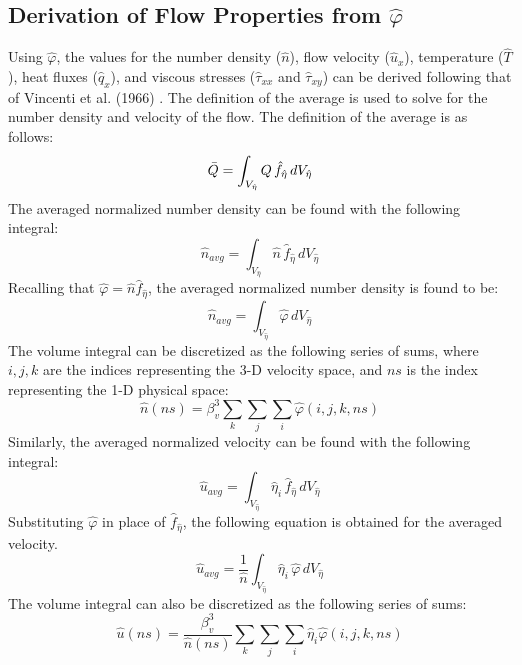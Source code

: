 \documentclass[a4paper]{article}
\begin{document}
\subsection{Derivation of Flow Properties from $\hat{\varphi}$}
Using $\hat{\varphi}$, the values for the number density ($\hat{n}$), flow velocity ($\hat{u}_x$), temperature ($\hat{T}$), heat fluxes ($\hat{q}_x$), and viscous stresses ($\hat{\tau}_{xx}$ and $\hat{\tau}_{xy}$) can be derived following that of Vincenti et al. (1966) \cite{vincenti1975introduction}. The definition of the average is used to solve for the number density and velocity of the flow. The definition of the average is as follows:
\begin{equation}
    \Bar{Q} = \int_{V_{\hat{\eta}}} Q\,\hat{f}_{\hat{\eta}}\,dV_{\hat{\eta}}
\end{equation}
The averaged normalized number density can be found with the following integral:
\begin{equation}
    \hat{n}_{avg} = \int_{V_{\hat{\eta}}} \hat{n}\,\hat{f}_{\hat{\eta}}\,dV_{\hat{\eta}}
\end{equation}
Recalling that $\hat{\varphi} = \hat{n} \hat{f}_{\hat{\eta}}$, the averaged normalized number density is found to be:
\begin{equation}
    \hat{n}_{avg} = \int_{V_{\hat{\eta}}} \hat{\varphi}\,dV_{\hat{\eta}}
\end{equation}
The volume integral can be discretized as the following series of sums, where $i,j,k$ are the indices representing the 3-D velocity space, and $ns$ is the index representing the 1-D physical space:
\begin{equation}
    \hat{n}(ns) = \beta_v^3 \sum_k \sum_j \sum_i \hat{\varphi}(i,j,k,ns)
\end{equation}
Similarly, the averaged normalized velocity can be found with the following integral:
\begin{equation}
    \hat{u}_{avg} = \int_{V_{\hat{\eta}}} \hat{\eta}_i\,\hat{f}_{\hat{\eta}}\,dV_{\hat{\eta}}
\end{equation}
Substituting $\hat{\varphi}$ in place of $\hat{f}_{\hat{\eta}}$, the following equation is obtained for the averaged velocity.
\begin{equation}
    \hat{u}_{avg} = \dfrac{1}{\hat{n}}\int_{V_{\hat{\eta}}} \hat{\eta}_i\,\hat{\varphi}\,dV_{\hat{\eta}}
\end{equation}
The volume integral can also be discretized as the following series of sums:
\begin{equation}
    \hat{u}(ns) = \dfrac{\beta_v^3}{\hat{n}(ns)} \sum_k \sum_j \sum_i \hat{\eta}_i\hat{\varphi}(i,j,k,ns) 
\end{equation}
\end{document}
